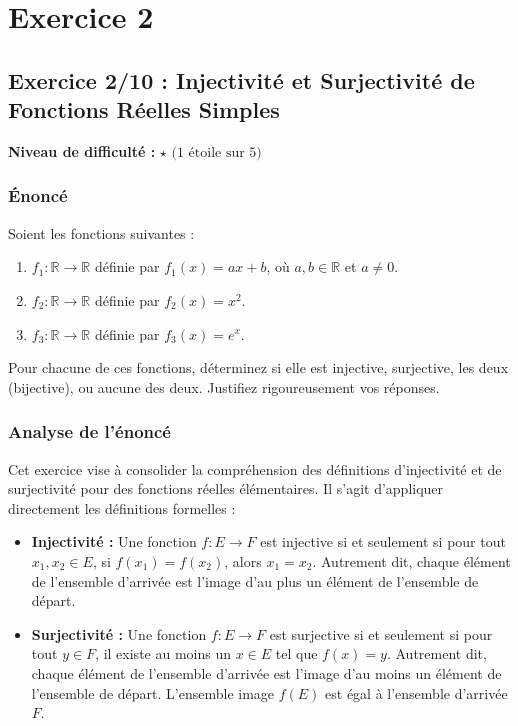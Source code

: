 \documentclass[12pt,a4paper]{report}
\providecommand{\tightlist}{%
  \setlength{\itemsep}{0pt}\setlength{\parskip}{0pt}}
\begin{document}
\section{Exercice 2}
\subsection{Exercice 2/10 : Injectivité et Surjectivité de Fonctions
Réelles
Simples}\label{exercice-210-injectivituxe9-et-surjectivituxe9-de-fonctions-ruxe9elles-simples}

\textbf{Niveau de difficulté :} \(\star \text{ (1 étoile sur 5)}\)

\subsubsection{Énoncé}\label{uxe9noncuxe9}

Soient les fonctions suivantes :

\begin{enumerate}
\def\labelenumi{\arabic{enumi}.}
\tightlist
\item
  \(f_1: \mathbb{R} \to \mathbb{R}\) définie par \(f_1(x) = ax+b\), où
  \(a, b \in \mathbb{R}\) et \(a \neq 0\).
\item
  \(f_2: \mathbb{R} \to \mathbb{R}\) définie par \(f_2(x) = x^2\).
\item
  \(f_3: \mathbb{R} \to \mathbb{R}\) définie par \(f_3(x) = e^x\).
\end{enumerate}

Pour chacune de ces fonctions, déterminez si elle est injective,
surjective, les deux (bijective), ou aucune des deux. Justifiez
rigoureusement vos réponses.

\subsubsection{Analyse de l'énoncé}\label{analyse-de-luxe9noncuxe9}

Cet exercice vise à consolider la compréhension des définitions
d'injectivité et de surjectivité pour des fonctions réelles
élémentaires. Il s'agit d'appliquer directement les définitions
formelles :

\begin{itemize}
\tightlist
\item
  \textbf{Injectivité :} Une fonction \(f: E \to F\) est injective si et
  seulement si pour tout \(x_1, x_2 \in E\), si \(f(x_1) = f(x_2)\),
  alors \(x_1 = x_2\). Autrement dit, chaque élément de l'ensemble
  d'arrivée est l'image d'au plus un élément de l'ensemble de départ.
\item
  \textbf{Surjectivité :} Une fonction \(f: E \to F\) est surjective si
  et seulement si pour tout \(y \in F\), il existe au moins un
  \(x \in E\) tel que \(f(x) = y\). Autrement dit, chaque élément de
  l'ensemble d'arrivée est l'image d'au moins un élément de l'ensemble
  de départ. L'ensemble image \(f(E)\) est égal à l'ensemble d'arrivée
  \(F\).
\end{itemize}
\end{document}
